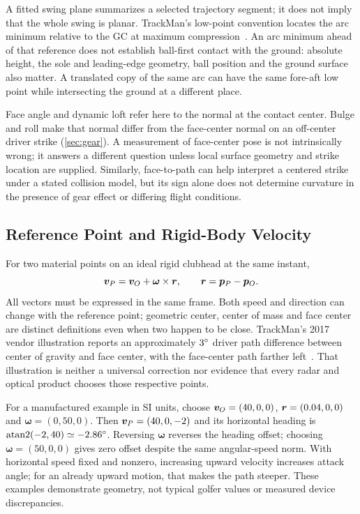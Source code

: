 A fitted swing plane summarizes a selected trajectory segment; it does not imply that the whole swing is planar.
TrackMan's low-point convention locates the arc minimum relative to the GC at maximum compression~\cite{trackmanlowpoint}.
An arc minimum ahead of that reference does not establish ball-first contact with the ground: absolute height, the sole and leading-edge geometry, ball position and the ground surface also matter.
A translated copy of the same arc can have the same fore-aft low point while intersecting the ground at a different place.

Face angle and dynamic loft refer here to the normal at the contact center.
Bulge and roll make that normal differ from the face-center normal on an off-center driver strike (\cref{sec:gear}).
A measurement of face-center pose is not intrinsically wrong; it answers a different question unless local surface geometry and strike location are supplied.
Similarly, face-to-path can help interpret a centered strike under a stated collision model, but its sign alone does not determine curvature in the presence of gear effect or differing flight conditions.

\subsection{Reference Point and Rigid-Body Velocity}
\label{sec:pathreference}

For two material points on an ideal rigid clubhead at the same instant,
\begin{equation}
\label{eq:pointvel}
\bm{v}_P=\bm{v}_O+\boldsymbol\omega\times\bm{r},
\qquad \bm{r}=\bm{p}_P-\bm{p}_O.
\end{equation}
All vectors must be expressed in the same frame.
Both speed and direction can change with the reference point; geometric center, center of mass and face center are distinct definitions even when two happen to be close.
TrackMan's 2017 vendor illustration reports an approximately $3\si{\degree}$ driver path difference between center of gravity and face center, with the face-center path farther left~\cite{trackmanclubdata}.
That illustration is neither a universal correction nor evidence that every radar and optical product chooses those respective points.

For a manufactured example in SI units, choose $\bm{v}_O=(40,0,0)$, $\bm{r}=(0.04,0,0)$ and $\boldsymbol\omega=(0,50,0)$.
Then $\bm{v}_P=(40,0,-2)$ and its horizontal heading is $\operatorname{atan2}(-2,40)\simeq-2.86\si{\degree}$.
Reversing $\boldsymbol\omega$ reverses the heading offset; choosing $\boldsymbol\omega=(50,0,0)$ gives zero offset despite the same angular-speed norm.
With horizontal speed fixed and nonzero, increasing upward velocity increases attack angle; for an already upward motion, that makes the path steeper.
These examples demonstrate geometry, not typical golfer values or measured device discrepancies.

